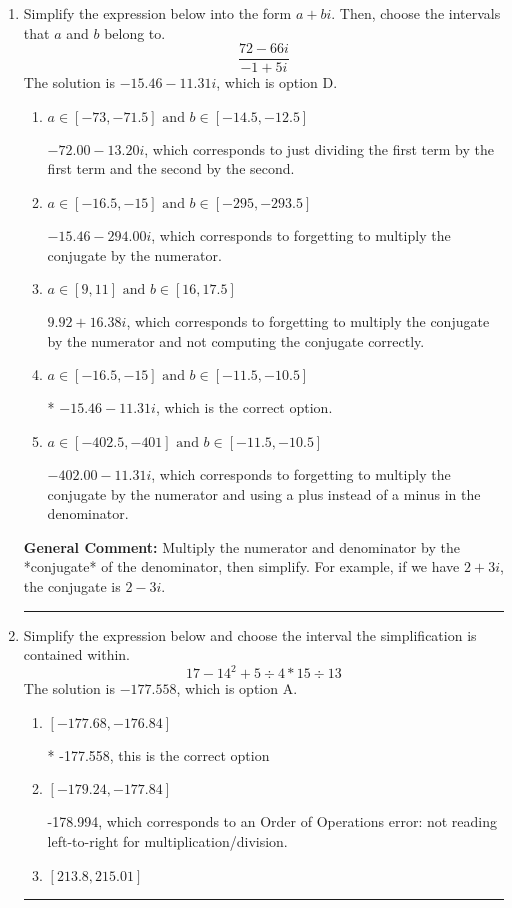 \documentclass{extbook}[14pt]
\newcommand{\litem}[1]{\item #1

\rule{\textwidth}{0.4pt}}
\begin{document}
\begin{enumerate}\litem{
Simplify the expression below into the form $a+bi$. Then, choose the intervals that $a$ and $b$ belong to.
\[ \frac{72 - 66 i}{-1 + 5 i} \]The solution is \( -15.46  - 11.31 i \), which is option D.\begin{enumerate}[label=\Alph*.]
\item \( a \in [-73, -71.5] \text{ and } b \in [-14.5, -12.5] \)

 $-72.00  - 13.20 i$, which corresponds to just dividing the first term by the first term and the second by the second.
\item \( a \in [-16.5, -15] \text{ and } b \in [-295, -293.5] \)

 $-15.46  - 294.00 i$, which corresponds to forgetting to multiply the conjugate by the numerator.
\item \( a \in [9, 11] \text{ and } b \in [16, 17.5] \)

 $9.92  + 16.38 i$, which corresponds to forgetting to multiply the conjugate by the numerator and not computing the conjugate correctly.
\item \( a \in [-16.5, -15] \text{ and } b \in [-11.5, -10.5] \)

* $-15.46  - 11.31 i$, which is the correct option.
\item \( a \in [-402.5, -401] \text{ and } b \in [-11.5, -10.5] \)

 $-402.00  - 11.31 i$, which corresponds to forgetting to multiply the conjugate by the numerator and using a plus instead of a minus in the denominator.
\end{enumerate}

\textbf{General Comment:} Multiply the numerator and denominator by the *conjugate* of the denominator, then simplify. For example, if we have $2+3i$, the conjugate is $2-3i$.
}
\litem{
Simplify the expression below and choose the interval the simplification is contained within.
\[ 17 - 14^2 + 5 \div 4 * 15 \div 13 \]The solution is \( -177.558 \), which is option A.\begin{enumerate}[label=\Alph*.]
\item \( [-177.68, -176.84] \)

* -177.558, this is the correct option
\item \( [-179.24, -177.84] \)

 -178.994, which corresponds to an Order of Operations error: not reading left-to-right for multiplication/division.
\item \( [213.8, 215.01] \)


\end{enumerate}}
\end{enumerate}
\end{document}

